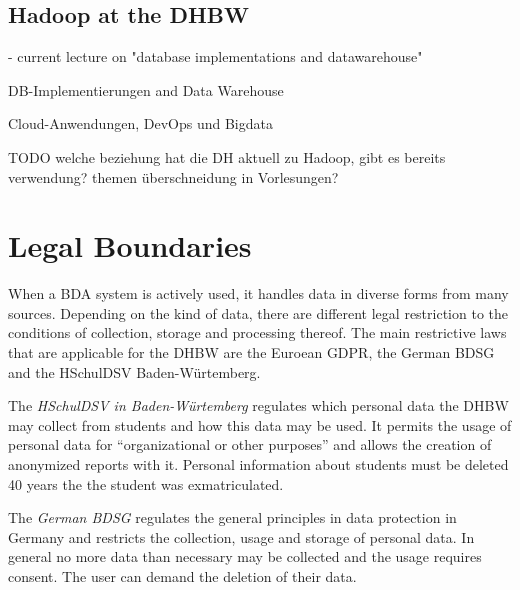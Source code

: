 \subsection{Hadoop at the DHBW}

- current lecture on "database implementations and datawarehouse"

\autocite[][]{DHBW2017aidbii}
DB-Implementierungen and Data Warehouse


\autocite[][]{DHBW2017aiwf}
Cloud-Anwendungen, DevOps und Bigdata

TODO welche beziehung hat die DH aktuell zu Hadoop, gibt es bereits verwendung? themen überschneidung in Vorlesungen?

\section{Legal Boundaries}
\label{sec:fund:legal}

When a \ac{BDA} system is actively used, it handles data in diverse forms from many sources.
Depending on the kind of data, there are different legal restriction 
to the conditions of collection, storage and processing thereof.
The main restrictive laws that are applicable for the \ac{DHBW} are the Euroean \ac{GDPR}, the German \ac{BDSG} and the \ac{HSchulDSV} Baden-Würtemberg.

The \emph{\ac{HSchulDSV} in Baden-Würtemberg}  regulates which personal data the \ac{DHBW} may collect from students and how this data may be used.
It permits the usage of personal data for \enquote{organizational or other purposes} and allows the creation of anonymized reports with it.
Personal information about students must be deleted 40 years the the student was exmatriculated. 
\autocite[][§1, §11, §12]{bw2012hcchuldsv}

The \emph{German \ac{BDSG}} regulates the general principles in data protection in Germany 
and restricts the collection, usage and storage of personal data.
In general no more data than necessary may be collected and the usage requires consent. 
The user can demand the deletion of their data.
\autocite[][§1ff., §12ff.]{bmjv2009bdsg}

